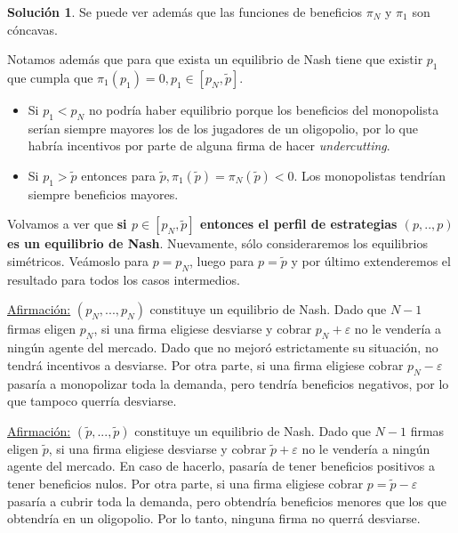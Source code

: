 \documentclass[a4paper, 11pt]{article}
\theoremstyle{definition}
\newtheorem{solucion}{Soluci\'on}
\begin{document}
\begin{solucion}

Se puede ver además que las funciones de beneficios $\pi_N$ y $\pi_1$ son cóncavas.

Notamos además que para que exista un equilibrio de Nash tiene que existir $p_1$ que cumpla que $\pi_1(p_1)=0, p_1\in [p_N, \widetilde{p}]$.
\begin{itemize}
    \item Si $p_1<p_N$ no podría haber equilibrio porque los beneficios del monopolista serían siempre mayores los de los jugadores de un oligopolio, por lo que habría incentivos por parte de alguna firma de hacer \textit{undercutting}.
    \item Si $p_1>\widetilde{p}$ entonces para $\widetilde{p}, \pi_1(\widetilde{p})=\pi_N(\widetilde{p})<0$. Los monopolistas tendrían siempre beneficios mayores.
\end{itemize}


Volvamos a ver que \textbf{si $p\in [p_N, \widetilde{p}]$ entonces el perfil de estrategias $(p,..,p)$ es un equilibrio de Nash}. Nuevamente, sólo consideraremos los equilibrios simétricos. Veámoslo para $p=p_N$, luego para $p=\widetilde{p}$ y por último extenderemos el resultado para todos los casos intermedios.


\underline{Afirmación:} $(p_N,...,p_N)$ constituye un equilibrio de Nash. Dado que $N-1$ firmas eligen $p_N$, si una firma eligiese desviarse y cobrar $p_N+\varepsilon$ no le vendería a ningún agente del mercado. Dado que no mejoró estrictamente su situación, no tendrá incentivos a desviarse. Por otra parte, si una firma eligiese cobrar $p_N-\varepsilon$ pasaría a monopolizar toda la demanda, pero tendría beneficios negativos, por lo que tampoco querría desviarse.


\underline{Afirmación:} $(\widetilde{p},...,\widetilde{p})$ constituye un equilibrio de Nash. Dado que $N-1$ firmas eligen $\widetilde{p}$, si una firma eligiese desviarse y cobrar $\widetilde{p}+\varepsilon$ no le vendería a ningún agente del mercado. En caso de hacerlo, pasaría de tener beneficios positivos a tener beneficios nulos. Por otra parte, si una firma eligiese cobrar $p=\widetilde{p}-\varepsilon$ pasaría a cubrir toda la demanda, pero obtendría beneficios menores que los que obtendría en un oligopolio. Por lo tanto, ninguna firma no querrá desviarse.


\end{solucion}
\end{document}
